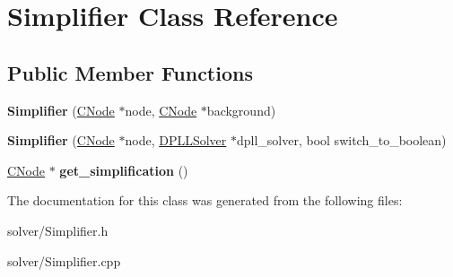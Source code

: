 \hypertarget{classSimplifier}{\section{\-Simplifier \-Class \-Reference}
\label{classSimplifier}
}
\subsection*{\-Public \-Member \-Functions}
\begin{DoxyCompactItemize}
\item 
\hypertarget{classSimplifier_ac167c99291fc8a823d20c0db8cda6da5}{{\bfseries \-Simplifier} (\hyperlink{classCNode}{\-C\-Node} $\ast$node, \hyperlink{classCNode}{\-C\-Node} $\ast$background)}\label{classSimplifier_ac167c99291fc8a823d20c0db8cda6da5}

\item 
\hypertarget{classSimplifier_ad4e03d8d662ec9f6a1f6c1f05c726d5c}{{\bfseries \-Simplifier} (\hyperlink{classCNode}{\-C\-Node} $\ast$node, \hyperlink{classDPLLSolver}{\-D\-P\-L\-L\-Solver} $\ast$dpll\-\_\-solver, bool switch\-\_\-to\-\_\-boolean)}\label{classSimplifier_ad4e03d8d662ec9f6a1f6c1f05c726d5c}

\item 
\hypertarget{classSimplifier_ab84e47ceab782bb416a5da55ce807607}{\hyperlink{classCNode}{\-C\-Node} $\ast$ {\bfseries get\-\_\-simplification} ()}\label{classSimplifier_ab84e47ceab782bb416a5da55ce807607}

\end{DoxyCompactItemize}


\-The documentation for this class was generated from the following files\-:\begin{DoxyCompactItemize}
\item 
solver/\-Simplifier.\-h\item 
solver/\-Simplifier.\-cpp\end{DoxyCompactItemize}
